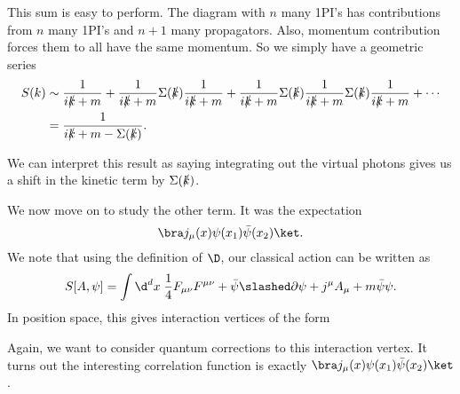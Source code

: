 \documentclass[a4paper]{article}
\begin{document}
This sum is easy to perform. The diagram with $n$ many 1PI's has contributions from $n$ many 1PI's and $n + 1$ many propagators. Also, momentum contribution forces them to all have the same momentum. So we simply have a geometric series
\begin{align*}
  S(k) &\sim \frac{1}{i\slashed{k} + m} + \frac{1}{i\slashed{k} + m} \Sigma(\slashed{k}) \frac{1}{i\slashed{k} + m} + \frac{1}{i\slashed{k} + m} \Sigma(\slashed{k}) \frac{1}{i\slashed{k} + m} \Sigma(\slashed{k}) \frac{1}{i\slashed{k} + m} + \cdots\\
  &= \frac{1}{i\slashed{k} + m- \Sigma(\slashed{k})}.
\end{align*}

We can interpret this result as saying integrating out the virtual photons gives us a shift in the kinetic term by $\Sigma(\slashed{k})$.

We now move on to study the other term. It was the expectation
\[
  \bra j_\mu(x) \psi(x_1) \bar\psi(x_2)\ket.
\]
We note that using the definition of $\D$, our classical action can be written as
\[
  S[A, \psi] = \int \d^d x\; \frac{1}{4} F_{\mu\nu}F^{\mu\nu} + \bar\psi \slashed \partial \psi + j^\mu A_\mu + m \bar\psi \psi.
\]
In position space, this gives interaction vertices of the form
\begin{center}
\end{center}
Again, we want to consider quantum corrections to this interaction vertex. It turns out the interesting correlation function is exactly $\bra j_\mu(x) \psi(x_1) \bar\psi(x_2)\ket$.
\end{document}
